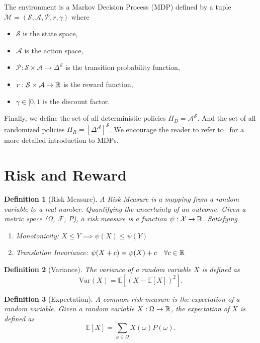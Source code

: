 \documentclass[10pt]{article}
\newtheorem{definition}{Definition}
\renewcommand{\cite}{\citep}
\theoremstyle{plain}
\theoremstyle{remark}
\begin{document}
The environment is a Markov Decision Process (MDP) defined by a tuple $\mathcal{M} = (\mathcal{S}, \mathcal{A}, \mathcal{P}, r, \gamma)$ where
\begin{itemize}
        \item $\mathcal{S}$ is the state space,
        \item $\mathcal{A}$ is the action space,
        \item $\mathcal{P} : \mathcal{S} \times \mathcal{A} \to \Delta^\mathcal{S}$ is the transition probability function,
        \item $r : \mathcal{S} \times \mathcal{A} \to \mathbb{R}$ is the reward function,
        \item $\gamma \in [0, 1$ is the discount factor.
\end{itemize} 
Finally, we define the set of all deterministic policies $\Pi_D = \mathcal{A}^\mathcal{S}$. 
And the set of all randomized policies $\Pi_R = [\Delta^\mathcal{A}]^\mathcal{S}$.
We encourage the reader to refer to~\cite{Puterman1994} for a more detailed introduction to MDPs.

\section{Risk and Reward}

\begin{definition}[Risk Measure]
        \label{def:risk}
        A Risk Measure is a mapping from a random variable to a real number. Quantifying the uncertainty of an outcome.
        Given a metric space ($\Omega$, $\mathcal{F}$, $P$), a risk measure is a function $\psi: \mathcal{X} \to \mathbb{R}$. Satisfying
        \begin{enumerate}
                \item Monotonicity: $X \leq Y \implies \psi(X) \leq \psi(Y)$
                \item Translation Invariance: $\psi(X + c) = \psi(X) + c \quad \forall c \in \mathbb{R}$
        \end{enumerate}
\end{definition}

\begin{definition}[Variance]
        \label{def:variance}
        The variance of a random variable $X$ is defined as 
        $$\text{Var}(X) = \mathbb{E}[(X - \mathbb{E}[X])^2].$$
\end{definition}

\begin{definition}[Expectation]
        \label{def:expectation}
        A common risk measure is the expectation of a random variable. Given a random variable $X: \Omega \to \mathbb{R}$, the expectation of $X$ is defined as
        $$\mathbb{E}[X] = \sum_{\omega \in \Omega} X(\omega) P(\omega).$$
\end{definition}
\end{document}
